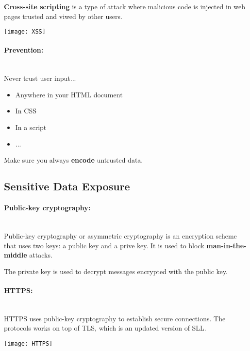 \documentclass[../ESOF_notes.tex]{subfiles}
\begin{document}
\textbf{Cross-site scripting} is a type of attack where malicious code is injected in web pages trusted and viwed by other users.

\begin{center}
    \texttt{[image: XSS]}
\end{center}

\paragraph{Prevention:} \mbox{}\\

Never trust user input...
\begin{itemize}
    \item Anywhere in your HTML document
    \item In CSS
    \item In a script
    \item ...
\end{itemize}

Make sure you always \textbf{encode} untrusted data.

\subsection{Sensitive Data Exposure}

\paragraph{Public-key cryptography:} \mbox{}\\

Public-key cryptography or asymmetric cryptography is an encryption scheme that uses two keys: a public key and a prive key. It is used to block \textbf{man-in-the-middle} attacks.

The private key is used to decrypt messages encrypted with the public key.

\paragraph{HTTPS:}\mbox{}\\

HTTPS uses public-key cryptography to establish secure connections.
The protocols works on top of TLS, which is an updated version of SLL.

\begin{center}
    \texttt{[image: HTTPS]}
\end{center}
\end{document}
